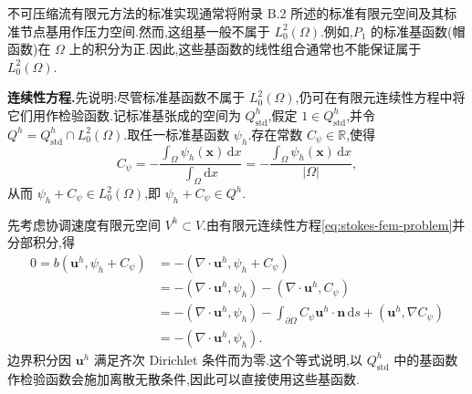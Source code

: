 \begin{note}\label{note:stokes-standard-pressure-space}\label{note:pressure-space-l2}
不可压缩流有限元方法的标准实现通常将附录 B.2 所述的标准有限元空间及其标准节点基用作压力空间.然而,这组基一般不属于 $L_0^2(\Omega)$.例如,$P_1$ 的标准基函数(帽函数)在 $\Omega$ 上的积分为正.因此,这些基函数的线性组合通常也不能保证属于 $L_0^2(\Omega)$.

\textbf{连续性方程.}先说明:尽管标准基函数不属于 $L_0^2(\Omega)$,仍可在有限元连续性方程中将它们用作检验函数.记标准基张成的空间为 $Q_{\mathrm{std}}^h$,假定 $1\in Q_{\mathrm{std}}^h$,并令 $Q^h=Q_{\mathrm{std}}^h\cap L_0^2(\Omega)$.取任一标准基函数 $\psi_h$.存在常数 $C_\psi\in\mathbb{R}$,使得
\begin{equation}\label{eq:stokes-standard-pressure-mean-shift}
  C_\psi=-\frac{\int_\Omega\psi_h(\bm{x})\,\mathrm{d}x}
           {\int_\Omega\mathrm{d}x}
   =-\frac{\int_\Omega\psi_h(\bm{x})\,\mathrm{d}x}{|\Omega|},
\end{equation}
从而 $\psi_h+C_\psi\in L_0^2(\Omega)$,即 $\psi_h+C_\psi\in Q^h$.

先考虑协调速度有限元空间 $V^h\subset V$.由有限元连续性方程\cref{eq:stokes-fem-problem}并分部积分,得
\[
\begin{aligned}
  0=b(\bm{u}^h,\psi_h+C_\psi)
  &=-(\nabla\cdot\bm{u}^h,\psi_h+C_\psi)\\
  &=-(\nabla\cdot\bm{u}^h,\psi_h)
     -(\nabla\cdot\bm{u}^h,C_\psi)\\
  &=- (\nabla\cdot\bm{u}^h,\psi_h)
     -\int_{\partial\Omega}C_\psi\bm{u}^h\cdot\bm{n}\,\mathrm{d}s
     +(\bm{u}^h,\nabla C_\psi)\\
  &=- (\nabla\cdot\bm{u}^h,\psi_h).
\end{aligned}
\]
边界积分因 $\bm{u}^h$ 满足齐次 Dirichlet 条件而为零.这个等式说明,以 $Q_{\mathrm{std}}^h$ 中的基函数作检验函数会施加离散无散条件,因此可以直接使用这些基函数.


\end{note}
